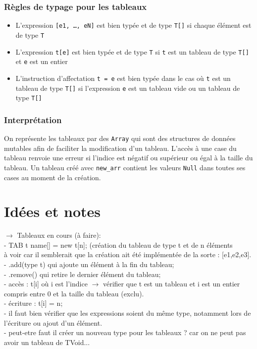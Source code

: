 \documentclass{article}
\begin{document}
\subsubsection{Règles de typage pour les tableaux} 
\begin{itemize}
    \item L'expression \texttt{[e1, \dots, eN]} est bien typée et de type \texttt{T[]} si chaque élément est de type \texttt{T}
    \item L'expression \texttt{t[e]} est bien typée et de type \texttt{T} si \texttt{t} est un tableau de type \texttt{T[]} et \texttt{e} est un entier
    \item L'instruction d'affectation \texttt{t = e} est bien typée dans le cas où \texttt{t} est un tableau de type \texttt{T[]} si l'expression \texttt{e} est un tableau vide ou un tableau de type \texttt{T[]}
\end{itemize}

\subsubsection{Interprétation}
On représente les tableaux par des \texttt{Array} qui sont des structures de données mutables afin de faciliter la modification d'un tableau.
L'accès à une case du tableau renvoie une erreur si l'indice est négatif ou supérieur ou égal à la taille du tableau.
Un tableau créé avec \texttt{new\_arr} contient les valeurs \texttt{Null} dans toutes ses cases au moment de la création.


\section{Idées et notes}
$\rightarrow$ Tableaux en cours (à faire):\\
- TAB t name[] = new t[n]; (création du tableau de type t et de n éléments\\
à voir car il semblerait que la création ait été implémentée de la sorte : [e1,e2,e3].\\
- .add(type t) qui ajoute un élément à la fin du tableau;\\
- .remove() qui retire le dernier élément du tableau;\\
- accès : t[i] où i est l'indice $\rightarrow$ vérifier que t est un tableau et i est un entier compris entre 0 et la taille du tableau (exclu).\\
- écriture : t[i] = n; \\
- il faut bien vérifier que les expressions soient du même type, notamment lors de l'écriture ou ajout d'un élément.\\
- peut-etre faut il créer un nouveau type pour les tableaux ? car on ne peut pas avoir un tableau de TVoid...
\end{document}
